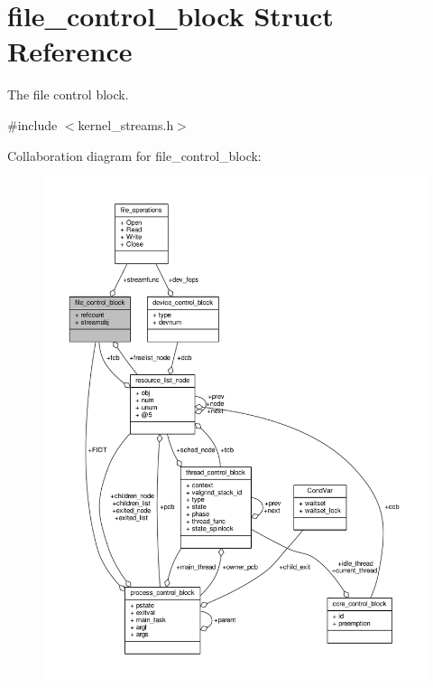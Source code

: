 \hypertarget{structfile__control__block}{\section{file\-\_\-control\-\_\-block Struct Reference}
\label{structfile__control__block}
}


The file control block.  




{\ttfamily \#include $<$kernel\-\_\-streams.\-h$>$}



Collaboration diagram for file\-\_\-control\-\_\-block\-:
\nopagebreak
\begin{figure}[H]
\begin{center}
\leavevmode
\includegraphics[width=350pt]{structfile__control__block__coll__graph}
\end{center}
\end{figure}
